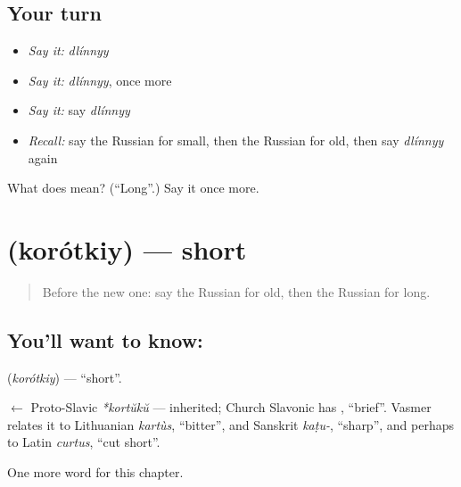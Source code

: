 \subsection*{Your turn}
\begin{itemize}
\raggedright
  \item \emph{Say it:} \emph{dlínnyy}
  \item \emph{Say it:} \emph{dlínnyy}, once more
  \item \emph{Say it:} say \emph{dlínnyy}
  \item \emph{Recall:} say the Russian for small, then the Russian for old, then say \emph{dlínnyy} again
\end{itemize}

\begin{tcolorbox}[breakable,colback=teal!4,colframe=teal!35!black,title={Before you move on}]
What does  mean? (\textquotedblleft{}Long\textquotedblright{}.) Say it once more.
\end{tcolorbox}
\section[\texorpdfstring{\ru{короткий} (korótkiy)}{короткий (korótkiy)}]{ (korótkiy) — short}

\label{lesson:RU-C65-short}



\begin{quote}
Before the new one: say the Russian for old, then the Russian for long.
\end{quote}

\subsection*{You'll want to know: }
\textbf{} (\emph{korótkiy}) — \textquotedblleft{}short\textquotedblright{}.

\begin{cousinweb}
\textbf{} $\leftarrow$ Proto-Slavic \emph{*kortŭkŭ} — inherited; Church Slavonic has \emph{}, \textquotedblleft{}brief\textquotedblright{}. Vasmer relates it to Lithuanian \emph{kartùs}, \textquotedblleft{}bitter\textquotedblright{}, and Sanskrit \emph{kaṭu-}, \textquotedblleft{}sharp\textquotedblright{}, and perhaps to Latin \emph{curtus}, \textquotedblleft{}cut short\textquotedblright{}.
\end{cousinweb}

\begin{grammarlens}[title={What you've built}]
One more word for this chapter.
\end{grammarlens}

